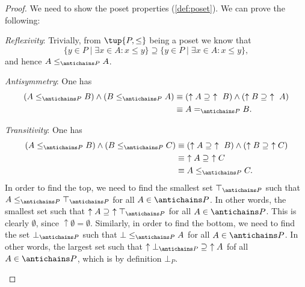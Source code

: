 \begin{proof}
We need to show the poset properties (\cref{def:poset}).
We can prove the following:
\begin{compactitem}
\item \emph{Reflexivity}: Trivially, from $\tup{P,\leq}$ being a poset we know that 
\begin{equation}
\{y\in P \mid \exists x\in A \colon x\leq y\} \supseteq \{y\in P \mid \exists x\in A \colon x\leq y\},
\end{equation}
and hence $A\leq_{\antichains P}A$.
\item \emph{Antisymmetry}: One has
\begin{equation}
    \begin{aligned}
    \left(A\leq_{\antichains P} B\right) \wedge \left(B\leq_{\antichains P} A\right)
    &\equiv \left(\uparrow A \supseteq \ \uparrow \ B\right) \wedge \left( \uparrow  B\supseteq \ \uparrow \ A\right)\\
    &\equiv A=_{\antichains P} B.
    \end{aligned}
\end{equation}
\item \emph{Transitivity}: One has
\begin{equation}
    \begin{aligned}
    \left(A\leq_{\antichains P} B\right) \wedge \left(B\leq_{\antichains P} C\right)&\equiv  \left(\uparrow A \supseteq \ \uparrow \ B\right) \wedge \left( \uparrow  B\supseteq \ \uparrow C\right)\\
    &\equiv \ \uparrow A\supseteq \ \uparrow C\\
    &\equiv A\leq_{\antichains P}C.
    \end{aligned}
\end{equation}
In order to find the top, we need to find the smallest set $\top_{\antichains P}$ such that $A\leq_{\antichains P} \top_{\antichains P} $ for all $A\in \antichains P$. In other words, the smallest set such that $\uparrow A\supseteq \ \uparrow \top_{\antichains P}$ for all $A\in \antichains P$. This is clearly $\emptyset$, since $\uparrow \emptyset = \emptyset$. Similarly, in order to find the bottom, we need to find the set $\bot_{\antichains P}$ such that $\bot\leq_{\antichains P} A$ for all $A\in \antichains P$. In other words, the largest set such that $\uparrow \bot_{\antichains P} \supseteq \ \uparrow A$ fof all $A\in \antichains P$, which is by definition $\bot_P$. 
\end{compactitem}
\end{proof}